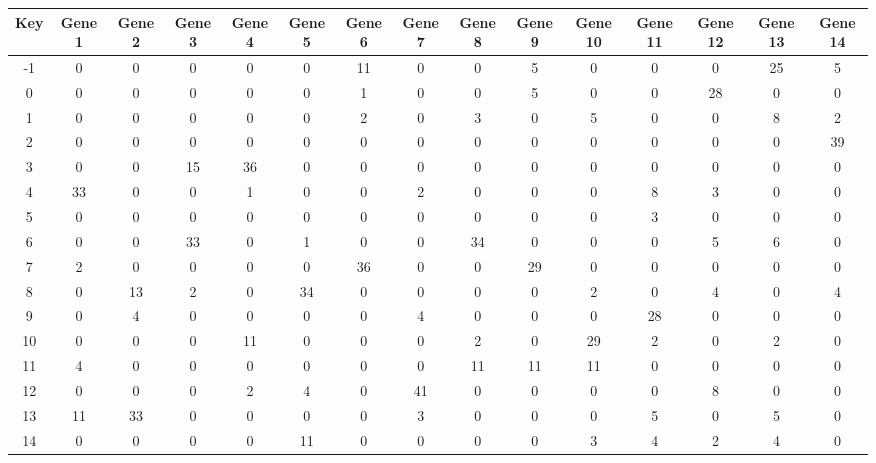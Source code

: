 \begin{tabular}{|c|c|c|c|c|c|c|c|c|c|c|c|c|c|c|}
\hline
Key & Gene 1 & Gene 2 & Gene 3 & Gene 4 & Gene 5 & Gene 6 & Gene 7 & Gene 8 & Gene 9 & Gene 10 & Gene 11 & Gene 12 & Gene 13 & Gene 14 \\
\hline
-1 & 0 & 0 & 0 & 0 & 0 & 11 & 0 & 0 & 5 & 0 & 0 & 0 & 25 & 5 \\
0 & 0 & 0 & 0 & 0 & 0 & 1 & 0 & 0 & 5 & 0 & 0 & 28 & 0 & 0 \\
1 & 0 & 0 & 0 & 0 & 0 & 2 & 0 & 3 & 0 & 5 & 0 & 0 & 8 & 2 \\
2 & 0 & 0 & 0 & 0 & 0 & 0 & 0 & 0 & 0 & 0 & 0 & 0 & 0 & 39 \\
3 & 0 & 0 & 15 & 36 & 0 & 0 & 0 & 0 & 0 & 0 & 0 & 0 & 0 & 0 \\
4 & 33 & 0 & 0 & 1 & 0 & 0 & 2 & 0 & 0 & 0 & 8 & 3 & 0 & 0 \\
5 & 0 & 0 & 0 & 0 & 0 & 0 & 0 & 0 & 0 & 0 & 3 & 0 & 0 & 0 \\
6 & 0 & 0 & 33 & 0 & 1 & 0 & 0 & 34 & 0 & 0 & 0 & 5 & 6 & 0 \\
7 & 2 & 0 & 0 & 0 & 0 & 36 & 0 & 0 & 29 & 0 & 0 & 0 & 0 & 0 \\
8 & 0 & 13 & 2 & 0 & 34 & 0 & 0 & 0 & 0 & 2 & 0 & 4 & 0 & 4 \\
9 & 0 & 4 & 0 & 0 & 0 & 0 & 4 & 0 & 0 & 0 & 28 & 0 & 0 & 0 \\
10 & 0 & 0 & 0 & 11 & 0 & 0 & 0 & 2 & 0 & 29 & 2 & 0 & 2 & 0 \\
11 & 4 & 0 & 0 & 0 & 0 & 0 & 0 & 11 & 11 & 11 & 0 & 0 & 0 & 0 \\
12 & 0 & 0 & 0 & 2 & 4 & 0 & 41 & 0 & 0 & 0 & 0 & 8 & 0 & 0 \\
13 & 11 & 33 & 0 & 0 & 0 & 0 & 3 & 0 & 0 & 0 & 5 & 0 & 5 & 0 \\
14 & 0 & 0 & 0 & 0 & 11 & 0 & 0 & 0 & 0 & 3 & 4 & 2 & 4 & 0 \\
\hline
\end{tabular}